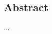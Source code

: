 \vspace*{15em}

\begin{center}
    \section*{Abstract}
    
        ...

\end{center}


{}

\newpage
